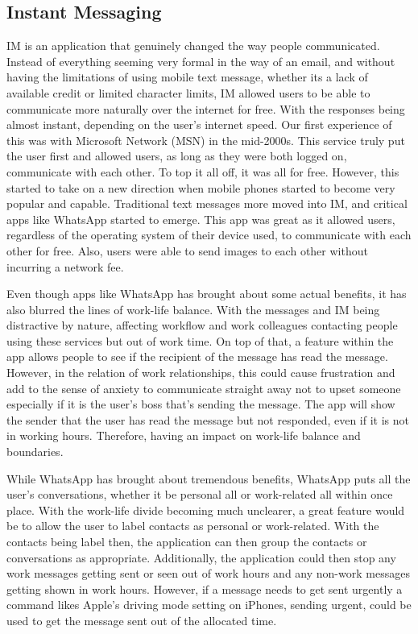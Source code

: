 \documentclass{sigchi}
\begin{document}
	\subsection{Instant Messaging}
		IM is an application that genuinely changed the way people communicated. Instead of everything seeming very formal in the way of an email, and without having the limitations of using mobile text message, whether its a lack of available credit or limited character limits, IM allowed users to be able to communicate more naturally over the internet for free. With the responses being almost instant, depending on the user's internet speed. Our first experience of this was with Microsoft Network (MSN) in the mid-2000s. This service truly put the user first and allowed users, as long as they were both logged on, communicate with each other. To top it all off, it was all for free. However, this started to take on a new direction when mobile phones started to become very popular and capable. Traditional text messages more moved into IM, and critical apps like WhatsApp started to emerge. This app was great as it allowed users, regardless of the operating system of their device used, to communicate with each other for free. Also, users were able to send images to each other without incurring a network fee.
		
		Even though apps like WhatsApp has brought about some actual benefits, it has also blurred the lines of work-life balance. With the messages and IM being distractive by nature, affecting workflow and work colleagues contacting people using these services but out of work time. On top of that, a feature within the app allows people to see if the recipient of the message has read the message. However, in the relation of work relationships, this could cause frustration and add to the sense of anxiety to communicate straight away not to upset someone especially if it is the user's boss that's sending the message. The app will show the sender that the user has read the message but not responded, even if it is not in working hours. Therefore, having an impact on work-life balance and boundaries.
		
		While WhatsApp has brought about tremendous benefits, WhatsApp puts all the user's conversations, whether it be personal all or work-related all within once place. With the work-life divide becoming much unclearer, a great feature would be to allow the user to label contacts as personal or work-related. With the contacts being label then, the application can then group the contacts or conversations as appropriate.  Additionally, the application could then stop any work messages getting sent or seen out of work hours and any non-work messages getting shown in work hours. However, if a message needs to get sent urgently a command likes Apple's driving mode setting on iPhones, sending urgent, could be used to get the message sent out of the allocated time.
	
\end{document}

